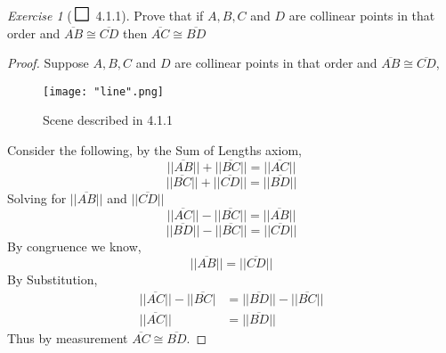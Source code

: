 \documentclass[12pt]{amsart}
\def\msquare{\mathord{\scalerel*{\Box}{gX}}}
\theoremstyle{remark}
\newtheorem*{exercise}{Exercise}%
\theoremstyle{mycomment}
\newcommand{\bproof}{\begin{proof}\setstretch{1.5}}
\newcommand{\eproof}{\end{proof}\singlespacing}
\begin{document}
\thispagestyle{fancy}

\begin{exercise}[$\msquare$ 4.1.1] Prove that if $A, B, C$ and $D$ are collinear points in that order and $\overline{AB} \cong \overline{CD}$ then $\overline{AC} \cong \overline{BD}$
\bproof Suppose  $A, B, C$ and $D$ are collinear points in that order and $\overline{AB} \cong \overline{CD}$, 

\begin{figure}[H]
\caption{Scene described in 4.1.1}
\centering
\texttt{[image: "line".png]}
\end{figure}
	





Consider the following, by the Sum of Lengths axiom,
\begin{equation*}
||\overline{AB}||+||\overline{BC}|| = ||\overline{AC}||
\end{equation*}
\begin{equation*}
 ||\overline{BC}||+||\overline{CD}|| = ||\overline{BD}||
\end{equation*}
Solving for $||\overline{AB}||$ and $||\overline{CD}||$
\begin{equation*}
||\overline{AC}||-||\overline{BC}|| = ||\overline{AB}||
\end{equation*}
\begin{equation*}
||\overline{BD}||-||\overline{BC}|| = ||\overline{CD}||
\end{equation*}
By congruence we know, 
\begin{equation*}
||\overline{AB}|| = ||\overline{CD}||
\end{equation*}
By Substitution,
\begin{align*}
||\overline{AC}||-||\overline{BC}| &= ||\overline{BD}||-||\overline{BC}||\\
||\overline{AC}|| &= ||\overline{BD}||
\end{align*}
Thus by measurement $\overline{AC} \cong \overline{BD}$.
\eproof 
\end{exercise}
\end{document}
